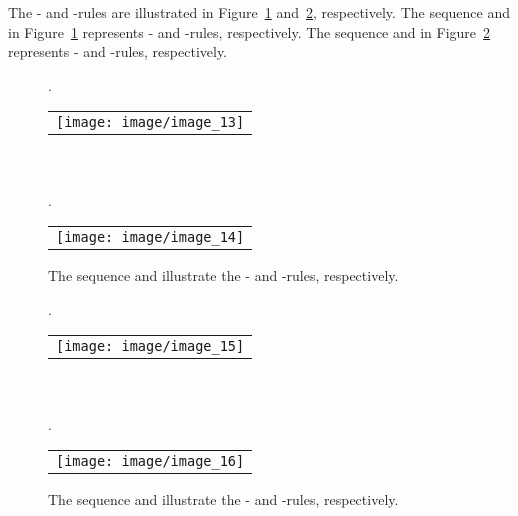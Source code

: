 \documentclass[a4paper,11pt]{article}
\begin{document}
The - and -rules are illustrated in Figure~\ref{image_13_14} and~\ref{image_15_16}, respectively.
The sequence  and  in Figure~\ref{image_13_14} represents - and -rules, respectively.
The sequence  and  in Figure~\ref{image_15_16} represents - and -rules, respectively.
\begin{figure}[!ht]
.
\begin{tabular}[c]{l}
\texttt{[image: image/image\_13]}
\end{tabular}\\ \\

.
\begin{tabular}[c]{l}
\texttt{[image: image/image\_14]}
\end{tabular}
\caption{The sequence  and  illustrate the - and -rules, respectively.}
\label{image_13_14}
\end{figure}
\begin{figure}[!ht]
.
\begin{tabular}[c]{l}
\texttt{[image: image/image\_15]}
\end{tabular}\\ \\

.
\begin{tabular}[c]{l}
\texttt{[image: image/image\_16]}
\end{tabular}
\caption{The sequence  and  illustrate the - and -rules, respectively.}
\label{image_15_16}
\end{figure}
\FloatBarrier
\end{document}
